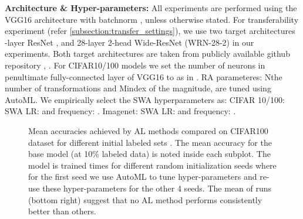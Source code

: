 \documentclass[10pt,twocolumn,letterpaper]{article}
\begin{document}
\noindent \textbf{Architecture \& Hyper-parameters: } All experiments are performed using the VGG16 architecture \cite{vgg16_simonyan2014very} with batchnorm \cite{batchnorm_ioffe2015batch}, unless otherwise stated. For transferability experiment (refer \cref{subsection:transfer_settings}), we use two target architectures -layer ResNet \cite{resnet_he2016deep}, and 28-layer 2-head Wide-ResNet (WRN-28-2) \cite{wide_resnet_zagoruyko2016wide} in our experiments. Both target architectures are taken from publicly available github repository  \cite{rn18_github}, \cite{wrn_Github}.
For CIFAR10/100 models we set the number of neurons in penultimate fully-connected layer of VGG16 to  as in \cite{rn18_github}. RA parameteres: Nthe number of transformations and Mindex of the magnitude, are tuned using AutoML. We empirically select the SWA hyperparameters as: CIFAR 10/100: SWA LR:  and frequency: . Imagenet: SWA LR:  and frequency: . 




















\begin{figure*}
\begin{center}
  \vspace{-2em}
\end{center}
    \caption{Mean accuracies achieved by AL methods compared on CIFAR100 dataset for different initial labeled sets . The mean accuracy for the base model (at 10\% labeled data) is noted inside each subplot. The model is trained  times for different random initialization seeds where for the first seed we use AutoML to tune hyper-parameters and re-use these hyper-parameters for the other 4 seeds. The mean of  runs (bottom right) suggest that no AL method performs consistently better than others.}
    
\label{fig:cifar_five_lSets_stats_cif100}
  \vspace{-1em}
\end{figure*}
\end{document}
